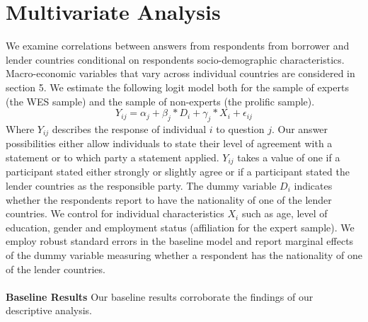 \clearpage
\section{Multivariate Analysis}
We examine correlations between answers from respondents from borrower and lender countries conditional on respondents socio-demographic characteristics. Macro-economic variables that vary across individual countries are considered in section 5. We estimate the following logit model both for the sample of experts (the WES sample) and the sample of non-experts (the prolific sample). 
\begin{equation*}
    Y_{ij}= \alpha_{j}+ \beta_{j} *D_{i} + \gamma_{j}*X_{i} + \epsilon_{ij}
\end{equation*}
Where $Y_{ij}$ describes the response of individual $i$ to question $j$. Our answer possibilities either allow individuals to state their level of agreement with a statement or to which party a statement applied. $Y_{ij}$ takes a value of one if a participant stated either strongly or slightly agree or if a participant stated the lender countries as the responsible party. The dummy variable $D_{i}$ indicates whether the respondents report to have the nationality of one of the lender countries. We control for individual characteristics $X_{i}$ such as age, level of education, gender and employment status (affiliation for the expert sample). 
We employ robust standard errors in the baseline model and report marginal effects of the dummy variable measuring whether a respondent has the nationality of one of the lender countries.
\\ \\
\textbf{Baseline Results} 
Our baseline results corroborate the findings of our descriptive analysis. \\ 
